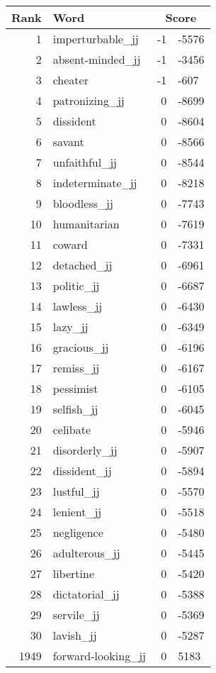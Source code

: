 \begin{longtable}[!htbp]{| rlr@{.}l |}
    \hline
    \textbf{Rank} & \textbf{Word} & \multicolumn{2}{c|}{\textbf{Score}} \\
    \hline
    \endhead
    1 & imperturbable\_jj & -1 & -5576 \\
    2 & absent-minded\_jj & -1 & -3456 \\
    3 & cheater & -1 & -607 \\
    4 & patronizing\_jj & 0 & -8699 \\
    5 & dissident & 0 & -8604 \\
    6 & savant & 0 & -8566 \\
    7 & unfaithful\_jj & 0 & -8544 \\
    8 & indeterminate\_jj & 0 & -8218 \\
    9 & bloodless\_jj & 0 & -7743 \\
    10 & humanitarian & 0 & -7619 \\
    11 & coward & 0 & -7331 \\
    12 & detached\_jj & 0 & -6961 \\
    13 & politic\_jj & 0 & -6687 \\
    14 & lawless\_jj & 0 & -6430 \\
    15 & lazy\_jj & 0 & -6349 \\
    16 & gracious\_jj & 0 & -6196 \\
    17 & remiss\_jj & 0 & -6167 \\
    18 & pessimist & 0 & -6105 \\
    19 & selfish\_jj & 0 & -6045 \\
    20 & celibate & 0 & -5946 \\
    21 & disorderly\_jj & 0 & -5907 \\
    22 & dissident\_jj & 0 & -5894 \\
    23 & lustful\_jj & 0 & -5570 \\
    24 & lenient\_jj & 0 & -5518 \\
    25 & negligence & 0 & -5480 \\
    26 & adulterous\_jj & 0 & -5445 \\
    27 & libertine & 0 & -5420 \\
    28 & dictatorial\_jj & 0 & -5388 \\
    29 & servile\_jj & 0 & -5369 \\
    30 & lavish\_jj & 0 & -5287 \\
    1949 & forward-looking\_jj & 0 & 5183 \\

\end{longtable}
